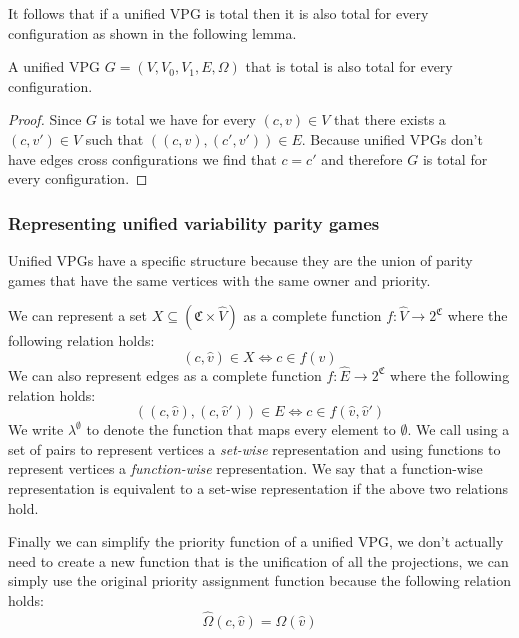 It follows that if a unified VPG is total then it is also total for every configuration as shown in the following lemma.
\begin{lemma}
	\label{lem_UVPG_total}
	A unified VPG $G = (V,V_0,V_1,E,\Omega)$ that is total is also total for every configuration.
	\begin{proof}
		Since $G$ is total we have for every $(c,v) \in V$ that there exists a $(c,v') \in V$ such that $((c,v),(c',v')) \in E$. Because unified VPGs don't have edges cross configurations we find that $c = c'$ and therefore $G$ is total for every configuration.
	\end{proof}
\end{lemma}

\subsubsection{Representing unified variability parity games}
Unified VPGs have a specific structure because they are the union of parity games that have the same vertices with the same owner and priority.

We can represent a set $X \subseteq (\mathfrak{C} \times \hat{V})$ as a complete function $f : \hat{V} \rightarrow 2^\mathfrak{C}$ where the following relation holds:
\[ (c,\hat{v}) \in X \iff c \in f(\hat{v}) \]
We can also represent edges as a complete function $f : \hat{E} \rightarrow 2^\mathfrak{C}$ where the following relation holds:
\[ ((c,\hat{v}),(c,\hat{v}')) \in E \iff c \in f(\hat{v},\hat{v}') \]
We write $\lambda^\emptyset$ to denote the function that maps every element to $\emptyset$. We call using a set of pairs to represent vertices a \textit{set-wise} representation and using functions to represent vertices a \textit{function-wise} representation. We say that a function-wise representation is equivalent to a set-wise representation if the above two relations hold.


Finally we can simplify the priority function of a unified VPG, we don't actually need to create a new function that is the unification of all the projections, we can simply use the original priority assignment function because the following relation holds:
\[ \hat{\Omega}(c,\hat{v}) = \Omega(\hat{v}) \]